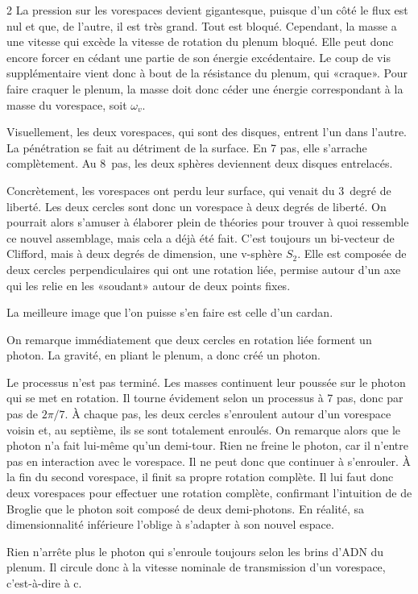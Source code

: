 \begin{multicols}{2}
La pression sur les vorespaces devient gigantesque, puisque d'un côté
le flux est nul et que, de l'autre, il est très grand. Tout est
bloqué. Cependant, la masse a une vitesse qui excède la vitesse de
rotation du plenum bloqué. Elle peut donc encore forcer en cédant une
partie de son énergie excédentaire. Le coup de vis supplémentaire
vient donc à bout de la résistance du plenum, qui «craque». Pour
faire craquer le plenum, la masse doit donc céder une énergie
correspondant à la masse du vorespace, soit $\omega_v$.

Visuellement, les deux vorespaces, qui sont des disques, entrent
l'un dans l'autre. La pénétration se fait au détriment de la surface.
En 7 pas, elle s'arrache complètement. Au 8\ieme\ pas, les deux sphères
deviennent deux disques entrelacés.

Concrètement, les vorespaces ont perdu leur surface, qui venait du 3\ieme\
degré de liberté. Les deux cercles sont donc un vorespace à deux
degrés de liberté. On pourrait alors s'amuser à élaborer plein de
théories pour trouver à quoi ressemble ce nouvel assemblage, mais cela
a déjà été fait. C'est toujours un bi-vecteur de Clifford, mais à deux
degrés de dimension, une v-sphère $S_2$. Elle est composée de deux
cercles perpendiculaires qui ont une rotation liée, permise autour
d'un axe qui les relie en les «soudant» autour de deux points fixes.

La meilleure image que l'on puisse s'en faire est celle d'un cardan.

On remarque immédiatement que deux cercles en rotation liée forment un
photon. La gravité, en pliant le plenum, a donc créé un photon.

Le processus n'est pas terminé. Les masses continuent leur poussée sur
le photon qui se met en rotation. Il tourne évidement selon un
processus à 7 pas, donc par pas de $2\pi/7$. À chaque pas, les deux
cercles s'enroulent autour d'un vorespace voisin et, au septième, ils
se sont totalement enroulés. On remarque alors que le photon n'a fait
lui-même qu'un demi-tour. Rien ne freine le photon, car il n'entre pas
en interaction avec le vorespace. Il ne peut donc que continuer à
s'enrouler. À la fin du second vorespace, il finit sa propre rotation
complète. Il lui faut donc deux vorespaces pour effectuer une rotation
complète, confirmant l'intuition de de Broglie que le photon soit
composé de deux demi-photons. En réalité, sa dimensionnalité inférieure
l'oblige à s'adapter à son nouvel espace.

Rien n'arrête plus le photon qui s'enroule toujours selon les brins
d'ADN du plenum. Il circule donc à la vitesse nominale de transmission
d'un vorespace, c'est-à-dire à c.


\end{multicols}
